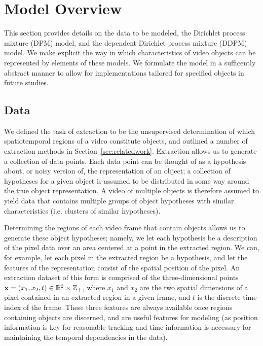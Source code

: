 \documentclass[smallcondensed, final]{svjour3}
\begin{document}
\section{Model Overview}
\label{sec:modeloverview}
%
This section provides details on the data to be modeled, the Dirichlet process mixture (DPM) model, and the dependent Dirichlet process mixture (DDPM) model. We make explicit the way in which characteristics of video objects can be represented by elements of these models. We formulate the model in a sufficently abstract manner to allow for implementations tailored for specified objects in future studies.




\subsection{Data}
\label{sec:data}
%
We defined the task of extraction to be the unsupervised determination of which spatiotemporal regions of a video constitute objects, and outlined a number of extraction methods in Section~\ref{sec:relatedwork}. Extraction allows us to generate a collection of data points. Each data point can be thought of as a hypothesis about, or noisy version of, the representation of an object; a collection of hypotheses for a given object is assumed to be distributed in some way around the true object representation. A video of multiple objects is therefore assumed to yield data that contains multiple groups of object hypotheses with similar characteristics (i.e. clusters of similar hypotheses).

Determining the regions of each video frame that contain objects allows us to generate these object hypotheses; namely, we let each hypothesis be a description of the pixel data over an area centered at a point in the extracted region. We can, for example, let each pixel in the extracted region be a hypothesis, and let the features of the representation consist of the spatial position of the pixel. An extraction dataset of this form is comprised of the three-dimensional points $\bold{x} = ( x_{1}, x_{2}, t ) \in \mathbb{R}^{2} \times \mathbb{Z}_{+}$, where $x_{1}$ and $x_{2}$ are the two spatial dimensions of a pixel contained in an extracted region in a given frame, and $t$ is the discrete time index of the frame. These three features are always available once regions containing objects are discerned, and are useful features for modeling (as position information is key for reasonable tracking and time information is necessary for maintaining the temporal dependencies in the data).
\end{document}
